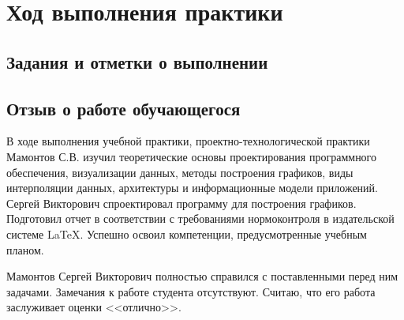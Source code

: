 \chapter*{Ход выполнения практики}

\section*{Задания и отметки о выполнении}







\clearpage
\section*{Отзыв о работе обучающегося}

В ходе выполнения учебной практики, проектно-технологической практики Мамонтов С.В. изучил теоретические основы проектирования программного обеспечения, визуализации данных, методы построения графиков, виды интерполяции данных, архитектуры и информационные модели приложений. Сергей Викторович спроектировал программу для построения графиков. Подготовил отчет в соответствии с требованиями нормоконтроля в издательской системе \LaTeX. Успешно освоил компетенции, предусмотренные учебным планом. 

Мамонтов Сергей Викторович полностью справился с поставленными перед ним задачами. Замечания к работе студента отсутствуют. Считаю, что его работа заслуживает оценки <<отлично>>.

\progressapprov
